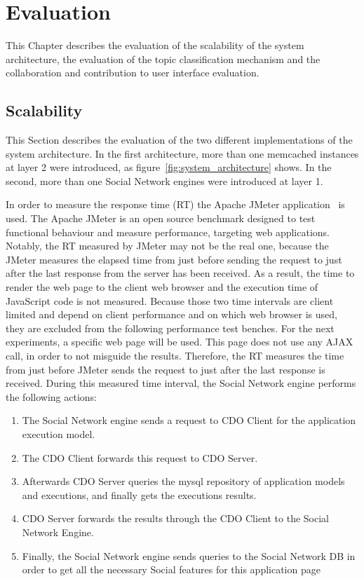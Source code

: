 \chapter{Evaluation}
\label{chapt:evaluation}
This Chapter describes the evaluation of the scalability of the system architecture, the evaluation of the topic classification mechanism and the collaboration and contribution to user interface evaluation.  

\section{Scalability}
\label{sec:eval_scalability}
This Section describes the evaluation of the two different implementations of the system architecture. In the first architecture, more than one memcached instances at layer 2 were introduced, as figure~\ref{fig:system_architecture} shows. In the second, more than one Social Network engines were introduced at layer 1.

In order to measure the response time (RT) the Apache JMeter application~\cite{jmeter_url} is used. The Apache JMeter is an open source benchmark designed to test functional behaviour and  measure performance, targeting web applications. Notably, the RT measured by JMeter may not be the real one, because the JMeter measures the elapsed time from just before sending the request to just after the last response from the server has been received. As a result, the time to render the web page to the client web browser and the execution time of JavaScript code is not measured. Because those two time intervals are client limited and depend on client performance and on which web browser is used, they are excluded from the following performance test benches. For the next experiments, a specific web page will be used. This page does not use any AJAX call, in order to not misguide the results. Therefore, the RT measures the time from just before JMeter sends the request to just after the last response is received. During this measured time interval, the Social Network engine performs the following actions:
\begin{enumerate}[I]
\item The Social Network engine sends a request to CDO Client for the application execution model.
\item The CDO Client forwards this request to CDO Server.
\item Afterwards CDO Server queries the mysql repository of application models and executions, and finally gets the executions results.
\item CDO Server forwards the results through the CDO Client to the Social Network Engine.
\item Finally, the Social Network engine sends queries to the Social Network DB in order to get all the necessary Social features for this application page
\end{enumerate}

